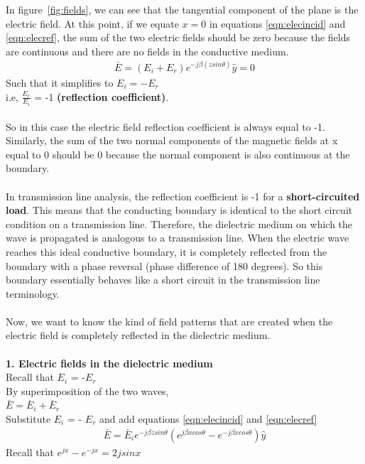 In figure~\ref{fig:fields}, we can see that the tangential component of the plane is the electric field. At this point, if we equate $x = 0$ in equations \ref{eqn:elecincid} and \ref{eqn:elecref}, the sum of the two electric fields should be zero because the fields are continuous and there are no fields in the conductive medium.
\begin{align}
\bar{E} = (E_i + E_r) e^{-j\beta(zsin\theta) }\hat{y} = 0
\end{align}
Such that it simplifies to $E_i = - E_r$\\
 i.e, $\frac{E_r}{E_i}$ = -1 \textbf{(reflection coefficient)}. \\\\
So in this case the electric field reflection coefficient is always equal to -1. Similarly, the sum of the two normal components of the
magnetic fields at x equal to 0 should be 0 because the normal component is also continuous at the boundary.\\\\ 
In transmission line analysis, the reflection coefficient is -1 for a \textbf{short-circuited load}. This means that the conducting boundary is identical to the short circuit condition on a transmission line. Therefore, the dielectric medium on which the wave is propagated is analogous to a transmission line. When the electric wave reaches this ideal conductive boundary, it is completely reflected from the boundary with a phase reversal (phase difference of 180 degrees). So this boundary essentially behaves like a short circuit in the transmission line terminology.\\\\
Now, we want to know the kind of field patterns that are created when the electric field is completely reflected in the dielectric medium.\\\\ 
\textbf{1. Electric fields in the dielectric medium}\\ 
Recall that $E_{i}$ = -$E_{r}$\\ 
By superimposition of the two waves,\\ 
$\bar{E}= \bar{E}_i + \bar{E}_r$\\ 
Substitute $E_i$ = - $E_r$ and add equations \ref{eqn:elecincid} and \ref{eqn:elecref}
\begin{align}
\bar{E}= \bar{E}_i e^{-j\beta zsin\theta} (e^{j\beta xcos\theta }- e^{-j\beta xcos\theta}) \hat{y}
\label{eqn:totalelectricfield}
\end{align}
Recall that $e^{jx} - e^{-jx} = 2jsinx$\\ 
